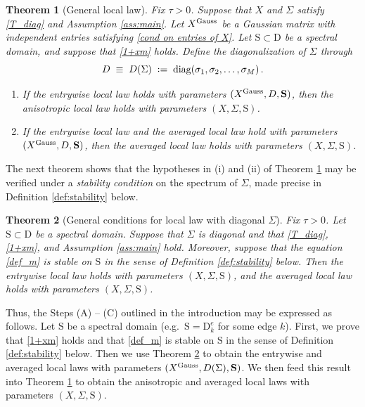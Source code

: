 \documentclass[11pt]{article} %
\numberwithin{equation}{section}
\numberwithin{figure}{section}
\theoremstyle{plain} %
\newtheorem{theorem}{Theorem}[section]
\theoremstyle{definition} %
\newcommand{\f}[1]{\boldsymbol{\mathrm{#1}}} %
\newcommand{\txt}[1]{\text{\rm{#1}}}
\newcommand*{\deq}{\mathrel{\vcenter{\baselineskip0.65ex \lineskiplimit0pt \hbox{.}\hbox{.}}}=}
\DeclareMathOperator{\diag}{diag}
\begin{document}
\begin{theorem}[General local law] \label{thm:gen_iso}
Fix $\tau > 0$. Suppose that $X$ and $\Sigma$ satisfy \eqref{T_diag} and Assumption \ref{ass:main}. Let $X^{\txt{Gauss}}$ be a Gaussian matrix with independent entries satisfying \eqref{cond on entries of X}.  Let $\f S \subset \f D$ be a spectral domain, and suppose that \eqref{1+xm} holds. Define the diagonalization of $\Sigma$ through
\begin{equation} \label{def_D_Sigma}
D \;\equiv\; D(\Sigma) \;\deq\; \diag(\sigma_1, \sigma_2, \dots, \sigma_M)\,.
\end{equation}
\begin{enumerate}
\item
If the entrywise local law holds with parameters $(X^{\txt{Gauss}}, D, \f S)$, then the anisotropic local law holds with parameters $(X, \Sigma, \f S)$.
\item
If the entrywise local law and the averaged local law hold with parameters $(X^{\txt{Gauss}}, D, \f S)$, then the averaged local law holds with parameters $(X, \Sigma, \f S)$.
\end{enumerate}
\end{theorem}



The next theorem shows that the hypotheses in (i) and (ii) of Theorem \ref{thm:gen_iso} may be verified under a \emph{stability condition} on the spectrum of $\Sigma$, made precise in Definition \ref{def:stability} below.

\begin{theorem}[General conditions for local law with diagonal $\Sigma$] \label{thm:diag_gen}
Fix $\tau > 0$. Let $\f S \subset \f D$ be a spectral domain. Suppose that $\Sigma$ is diagonal and that \eqref{T_diag}, \eqref{1+xm}, and Assumption \ref{ass:main} hold. Moreover, suppose that the equation \eqref{def_m} is stable on $\f S$ in the sense of Definition \ref{def:stability} below.
Then the entrywise local law holds with parameters $(X, \Sigma, \f S)$, and the averaged local law holds with parameters $(X, \Sigma, \f S)$.
\end{theorem}

Thus, the Steps (A) -- (C) outlined in the introduction may be expressed as follows. Let $\f S$ be a spectral domain (e.g.\ $\f S = \f D^e_k$ for some edge $k$). First, we prove that \eqref{1+xm} holds and that \eqref{def_m} is stable on $\f S$ in the sense of Definition \ref{def:stability} below. Then we use Theorem \ref{thm:diag_gen} to obtain the entrywise and averaged local laws with parameters $(X^{\txt{Gauss}}, D(\Sigma), \f S)$. We then feed this result into Theorem \ref{thm:gen_iso} to obtain the anisotropic and averaged local laws with parameters $(X, \Sigma, \f S)$.
\end{document}
